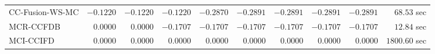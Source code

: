 \begin{table}[H]
\begin{tabular}{lrrrrrrrrr}
     CC-Fusion-WS-MC & $      -0.1220$ & $      -0.1220$ & $      -0.1220$ & $      -0.2870$ & $      -0.2891$ & $      -0.2891$ & $      -0.2891$ & $      -0.2891$ & $        68.53$ sec   \\ 
\cmidrule{1-1} 
           MCR-CCFDB & $       0.0000$ & $       0.0000$ & $      -0.1707$ & $      -0.1707$ & $      -0.1707$ & $      -0.1707$ & $      -0.1707$ & $      -0.1707$ & $        12.84$ sec   \\ 
\cmidrule{1-1} 
           MCI-CCIFD & $       0.0000$ & $       0.0000$ & $       0.0000$ & $       0.0000$ & $       0.0000$ & $       0.0000$ & $       0.0000$ & $       0.0000$ & $      1800.60$ sec   \\ 
\bottomrule
\end{tabular}
\end{table}

